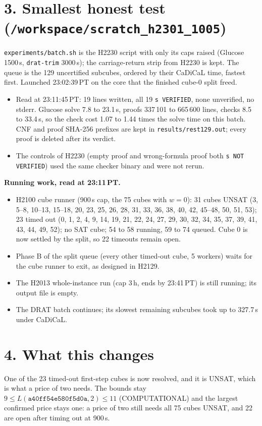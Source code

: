 \documentclass[11pt]{article}
\begin{document}
\section*{3. Smallest honest test (\texttt{/workspace/scratch\_h2301\_1005})}
\texttt{experiments/batch.sh} is the H2230 script with only its caps raised (Glucose 1500\,s, \texttt{drat-trim} 3000\,s); the carriage-return strip from H2230 is kept. The queue is the 129 uncertified subcubes, ordered by their CaDiCaL time, fastest first. Launched 23:02:39\,PT on the core that the finished cube-0 split freed.
\begin{itemize}
\item Read at 23:11:45\,PT: 19 lines written, all 19 \texttt{s VERIFIED}, none unverified, no stderr. Glucose solve 7.8 to 23.1\,s, proofs 337\,101 to 665\,600 lines, checks 8.5 to 33.4\,s, so the check cost 1.07 to 1.44 times the solve time on this batch. CNF and proof SHA-256 prefixes are kept in \texttt{results/rest129.out}; every proof is deleted after its verdict.
\item The controls of H2230 (empty proof and wrong-formula proof both \texttt{s NOT VERIFIED}) used the same checker binary and were not rerun.
\end{itemize}

\textbf{Running work, read at 23:11\,PT.}
\begin{itemize}
\item H2100 cube runner (900\,s cap, the 75 cubes with $w=0$): 31 cubes UNSAT (3, 5--8, 10--13, 15--18, 20, 23, 25, 26, 28, 31, 33, 36, 38, 40, 42, 45--48, 50, 51, 53); 23 timed out (0, 1, 2, 4, 9, 14, 19, 21, 22, 24, 27, 29, 30, 32, 34, 35, 37, 39, 41, 43, 44, 49, 52); no SAT cube; 54 to 58 running, 59 to 74 queued. Cube 0 is now settled by the split, so 22 timeouts remain open.
\item Phase B of the split queue (every other timed-out cube, 5 workers) waits for the cube runner to exit, as designed in H2129.
\item The H2013 whole-instance run (cap 3\,h, ends by 23:41\,PT) is still running; its output file is empty.
\item The DRAT batch continues; its slowest remaining subcubes took up to 327.7\,s under CaDiCaL.
\end{itemize}

\section*{4. What this changes}
One of the 23 timed-out first-step cubes is now resolved, and it is UNSAT, which is what a price of two needs. The bounds stay $9\le L(\texttt{a40ff54e580f5d0a},2)\le 11$ (COMPUTATIONAL) and the largest confirmed price stays one: a price of two still needs all 75 cubes UNSAT, and 22 are open after timing out at 900\,s.
\end{document}
